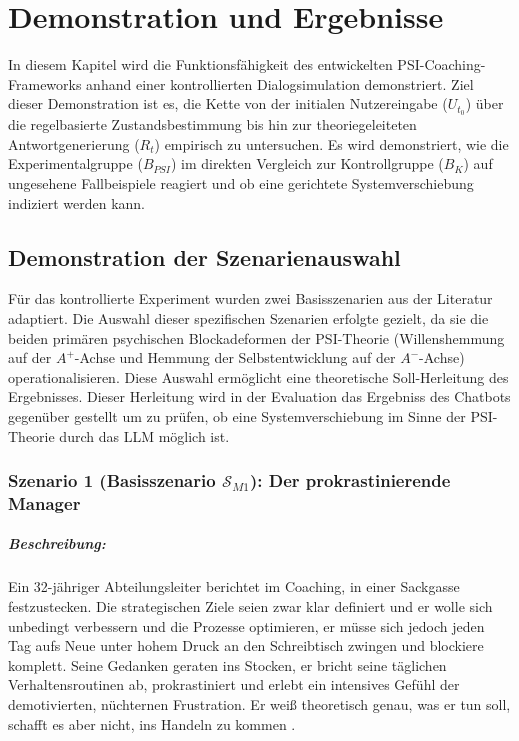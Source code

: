 \chapter{Demonstration und Ergebnisse} \label{chap:4}

In diesem Kapitel wird die Funktionsfähigkeit des entwickelten PSI-Coaching-Frameworks anhand einer kontrollierten Dialogsimulation demonstriert. Ziel dieser Demonstration ist es, die Kette von der initialen Nutzereingabe ($U_{t_0}$) über die regelbasierte Zustandsbestimmung bis hin zur theoriegeleiteten Antwortgenerierung ($R_t$) empirisch zu untersuchen. Es wird demonstriert, wie die Experimentalgruppe ($B_{PSI}$) im direkten Vergleich zur Kontrollgruppe ($B_K$) auf ungesehene Fallbeispiele reagiert und ob eine gerichtete Systemverschiebung indiziert werden kann.

\section{Demonstration der Szenarienauswahl}

Für das kontrollierte Experiment wurden zwei Basisszenarien aus der Literatur adaptiert. Die Auswahl dieser spezifischen Szenarien erfolgte gezielt, da sie die beiden primären psychischen Blockadeformen der PSI-Theorie (Willenshemmung auf der $A^+$-Achse und Hemmung der Selbstentwicklung auf der $A^-$-Achse) operationalisieren. Diese Auswahl ermöglicht eine theoretische Soll-Herleitung des Ergebnisses. Dieser Herleitung wird in der Evaluation das Ergebniss des Chatbots gegenüber gestellt um zu prüfen, ob eine Systemverschiebung im Sinne der PSI-Theorie durch das LLM möglich ist.

\subsection{Szenario 1 (Basisszenario $\mathcal{S}_{M1}$): Der prokrastinierende Manager}
\paragraph{Beschreibung:} Ein 32-jähriger Abteilungsleiter berichtet im Coaching, in einer Sackgasse festzustecken. Die strategischen Ziele seien zwar klar definiert und er wolle sich unbedingt verbessern und die Prozesse optimieren, er müsse sich jedoch jeden Tag aufs Neue unter hohem Druck an den Schreibtisch zwingen und blockiere komplett. Seine Gedanken geraten ins Stocken, er bricht seine täglichen Verhaltensroutinen ab, prokrastiniert und erlebt ein intensives Gefühl der demotivierten, nüchternen Frustration. Er weiß theoretisch genau, was er tun soll, schafft es aber nicht, ins Handeln zu kommen \citep{kuhl2014psi}.

